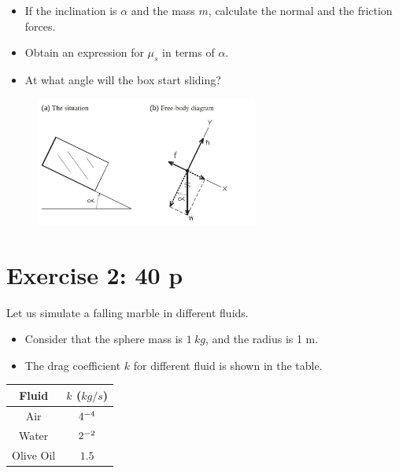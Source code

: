 \documentclass[12pt]{article}
\begin{document}
\begin{itemize}
  \item If the inclination is $\alpha$ and the mass $m$, calculate the normal and the friction forces.
  \item Obtain an expression for $\mu_s$ in terms of $\alpha$.
  \item At what angle will the box start sliding?
\end{itemize}




\begin{figure}[h!]
  \begin{center}
    \includegraphics[width=0.65\textwidth]{images/2.jpg}
\label{fig}
  \end{center}
 
\end{figure}



\section*{Exercise 2: 40 p}

Let us simulate a falling  marble in different fluids.



\begin{itemize}
  \item Consider that the sphere mass is $1~kg$, and the radius is 1 m.
  \item The drag coefficient $k$ for different fluid is shown in the table. 
\end{itemize}


\begin{center}
  \begin{tabular}{c | c  }
    \hline
\hline
    Fluid & $k$ ($kg/s$) \\
    \hline
    \hline
   Air & $4\time 10^{-4}$  \\ 
   Water & $2\time 10^{-2}$   \\  
   Olive Oil & $1.5$      
  \end{tabular}
  \end{center}
\end{document}
